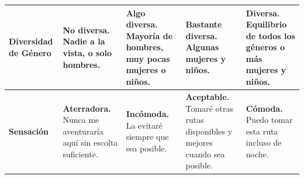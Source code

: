 \begin{table}[htbp]
\begin{tabular}{|p{2cm}|p{2.7cm}|p{2.7cm}|p{2.7cm}|p{2.7cm}|}
\textbf{Diversidad de Género} & \textbf{No diversa.} Nadie a la vista, o solo hombres. & \textbf{Algo diversa.} Mayoría de hombres, muy pocas mujeres o niños. & \textbf{Bastante diversa.} Algunas mujeres y niños. & \textbf{Diversa.} Equilibrio de todos los géneros o más mujeres y niños. \\ \hline
\textbf{Sensación} & \textbf{Aterradora.} Nunca me aventuraría aquí sin escolta suficiente. & \textbf{Incómoda.} La evitaré siempre que sea posible. & \textbf{Aceptable.} Tomaré otras rutas disponibles y mejores cuando sea posible. & \textbf{Cómoda.} Puedo tomar esta ruta incluso de noche. \\ \hline
\end{tabular}
\end{table}
